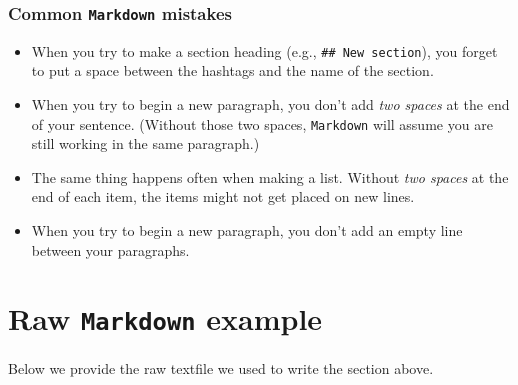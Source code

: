\documentclass[]{book}
\begin{document}
\hypertarget{common-markdown-mistakes}{%
\subsubsection*{\texorpdfstring{Common \texttt{Markdown} mistakes}{Common Markdown mistakes}}\label{common-markdown-mistakes}}

\begin{itemize}
\item
  When you try to make a section heading (e.g., \texttt{\#\#\ New\ section}),
  you forget to put a space between the hashtags and the name of the section.
\item
  When you try to begin a new paragraph, you don't add \emph{two spaces}
  at the end of your sentence. (Without those two spaces, \texttt{Markdown}
  will assume you are still working in the same paragraph.)
\item
  The same thing happens often when making a list. Without \emph{two spaces}
  at the end of each item, the items might not get placed on new lines.
\item
  When you try to begin a new paragraph, you don't add an empty line
  between your paragraphs.
\end{itemize}

\hypertarget{raw-markdown-example}{%
\section*{\texorpdfstring{Raw \texttt{Markdown} example}{Raw Markdown example}}\label{raw-markdown-example}}

Below we provide the raw textfile we used to write the section above.
\end{document}
